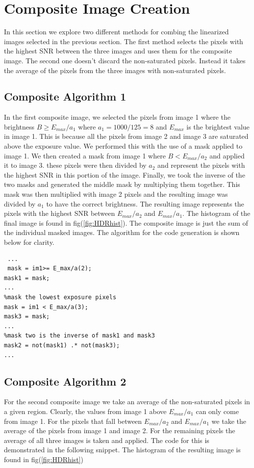 \documentclass[a4paper]{article}
\begin{document}
\FloatBarrier
\section{Composite Image Creation}
In this section we explore two different methods for combing the linearized images selected in the previous section. The first method selects the pixels with the highest SNR between the three images and uses them for the composite image.  The second one doesn't discard the non-saturated pixels.  Instead it takes the average of the pixels from the three images with non-saturated pixels. 

\subsection{Composite Algorithm 1}
 In the first composite image, we selected the pixels from image 1 where the brightness $B \ge E_{max} /a_1$ where $a_1 = 1000/125 = 8$ and $E_{max}$ is the brightest value in image 1. This is because all the pixels from image 2 and image 3 are saturated above the exposure value.  We performed this with the use of a mask applied to image 1.  We then created a mask from image 1 where $B  <E_{max} /a_2$  and applied it to image 3.  these  pixels were then  divided by $a_2$ and represent the pixels with the highest SNR in this portion of the image.  Finally, we took the inverse of the two masks and generated the middle mask by multiplying them together.  This mask was then multiplied with image 2 pixels and the resulting image was  divided by $a_1$ to have the correct brightness.  The resulting image represents the pixels with the highest SNR between $E_{max}/a_{2}$ and $E_{max}/a_1$. The histogram of the final image is found in fig(\ref{fig:HDRhist}). The composite image is just the sum of the individual masked images.  The algorithm for the code generation is shown below for clarity.
 \begin{verbatim}
 ...
 mask = im1>= E_max/a(2);
mask1 = mask;
...
%mask the lowest exposure pixels
mask = im1 < E_max/a(3);
mask3 = mask;
...
%mask two is the inverse of mask1 and mask3
mask2 = not(mask1) .* not(mask3);
...
 \end{verbatim}

\FloatBarrier
\subsection{Composite Algorithm 2}
For the second composite image we take an average of the non-saturated pixels in a given region.  Clearly, the values from image 1 above $E_{max}/a_1$ can only come from image 1.  For the pixels that fall between  $E_{max}/a_{2}$ and $E_{max}/a_1$ we take the average of the pixels from image 1 and image 2.  For the remaining pixels the average of all three images is taken and applied.  The code for this is demonstrated in the following snippet. The histogram of the resulting image is found in fig(\ref{fig:HDRhist}) 
\end{document}

